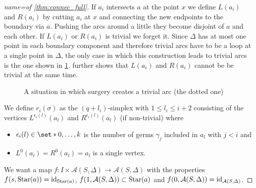 \begin{proof}[{name={of \autoref{thm:connec_full}}}]
	If $a_i$ intersects $a$ at the point $x$ we define $L(a_i)$ and $R(a_i)$ by cutting $a_i$ at $x$ and connecting the new endpoints to the boundary via $a$.
	Pushing the arcs around a little they become disjoint of $a$ and each other.
	If $L(a_i)$ or $R(a_i)$ is trivial we forget it.
	Since $\Delta$ has at most one point in each boundary component and therefore trivial arcs have to be a loop at a single point in $\Delta$, the only case in which this construction leads to trivial arcs is the one shown in \cref{fig:surg_trivial}.
	 further shows that $L(a_i)$ and $R(a_i)$ cannot be be trivial at the same time.
	\begin{figure}[hbt]
		\centering
		\caption{A situation in which surgery creates a trivial arc (the dotted one)}\label{fig:surg_trivial}
	\end{figure}
	
	We define $r_i(\sigma)$ as the $(q+ l_i)$-simplex with $1 \le l_i \le i + 2$ consisting of the vertices $L^{\epsilon_i(l)}(a_l)$ and $R^{\epsilon_i(l)}(a_l)$ (if non-trivial)  where 
	\begin{itemize}
		\item $\epsilon_i(l) \in \set*{0, \ldots ,k}$ is the number of germs $\gamma_j$ included in $a_l$ with $j < i$ and
		\item $L^0(a_l)=R^0(a_l)=a_l$ is a single vertex.
	\end{itemize}
	We want a map $f \colon I \times \mathcal{A}(S,\Delta) \to \mathcal{A}(S,\Delta)$ with the properties $f(s,\operatorname{Star}(a)) = \operatorname{id}_{\operatorname{Star}(a)}$, $f(1,\mathcal{A}(S,\Delta)) \subset \operatorname{Star}(a)$ and $f(0,\mathcal{A}(S,\Delta)) = \operatorname{id}_{\mathcal{A}(S,\Delta)}$.
	
\end{proof}

